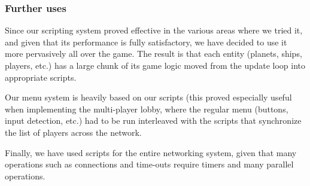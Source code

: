 \subsubsection{Further uses}

Since our scripting system proved effective in the various areas where we tried it, and given that its performance is fully satisfactory, we have decided to use it more pervasively all over the game. The result is that each entity (planets, ships, players, etc.) has a large chunk of its game logic moved from the update loop into appropriate scripts.

Our menu system is heavily based on our scripts (this proved especially useful when implementing the multi-player lobby, where the regular menu (buttons, input detection, etc.) had to be run interleaved with the scripts that synchronize the list of players across the network.

Finally, we have used scripts for the entire networking system, given that many operations such as connections and time-outs require timers and many parallel operations.